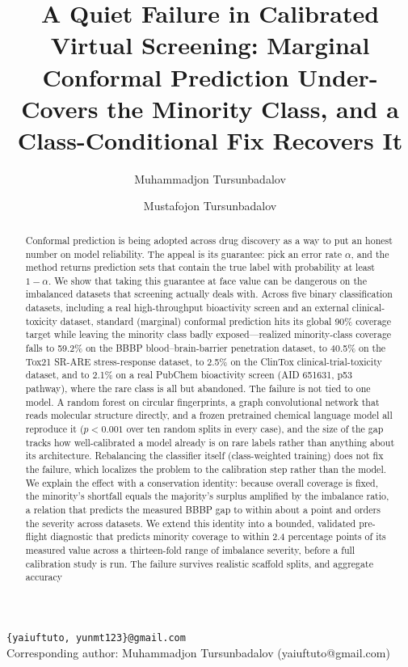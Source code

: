 \documentclass[11pt]{article}
\title{A Quiet Failure in Calibrated Virtual Screening: Marginal Conformal Prediction Under-Covers the Minority Class, and a Class-Conditional Fix Recovers It}
\author[1]{Muhammadjon Tursunbadalov}
\author[1]{Mustafojon Tursunbadalov}
\affil[1]{School of Science and Technology, Champions College Prep, United States}
\date{}
\begin{document}
\maketitle
\noindent\texttt{\{yaiuftuto, yunmt123\}@gmail.com} \\
\noindent Corresponding author: Muhammadjon Tursunbadalov (yaiuftuto@gmail.com)

\begin{abstract}
Conformal prediction is being adopted across drug discovery as a way to put an honest number on
model reliability. The appeal is its guarantee: pick an error rate $\alpha$, and the method
returns prediction sets that contain the true label with probability at least $1-\alpha$. We show
that taking this guarantee at face value can be dangerous on the imbalanced datasets that
screening actually deals with. Across five binary classification datasets, including a real
high-throughput bioactivity screen and an external clinical-toxicity dataset, standard (marginal)
conformal prediction hits its global 90\% coverage target while leaving the minority class badly
exposed---realized minority-class coverage falls to 59.2\% on the BBBP blood--brain-barrier
penetration dataset, to 40.5\% on the Tox21 SR-ARE stress-response dataset, to 2.5\% on the
ClinTox clinical-trial-toxicity dataset, and to 2.1\% on a real PubChem bioactivity screen (AID
651631, p53 pathway), where the rare class is all but abandoned. The failure is not tied to one
model. A random forest on circular fingerprints, a graph convolutional network that reads
molecular structure directly, and a frozen pretrained chemical language model all reproduce it
($p<0.001$ over ten random splits in every case), and the size of the gap tracks how
well-calibrated a model already is on rare labels rather than anything about its architecture.
Rebalancing the classifier itself (class-weighted training) does not fix the failure, which
localizes the problem to the calibration step rather than the model. We explain the effect with a
conservation identity: because overall coverage is fixed, the minority's shortfall equals the
majority's surplus amplified by the imbalance ratio, a relation that predicts the measured BBBP gap
to within about a point and orders the severity across datasets. We extend this identity into a
bounded, validated pre-flight diagnostic that predicts minority coverage to within 2.4 percentage
points of its measured value across a thirteen-fold range of imbalance severity, before a full
calibration study is run. The failure survives realistic scaffold splits, and aggregate accuracy

\end{abstract}
\end{document}
